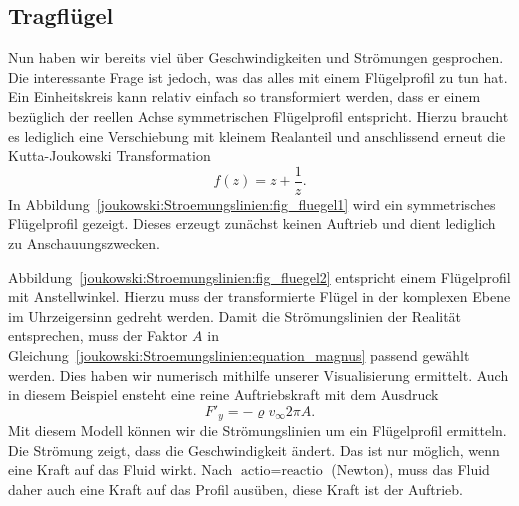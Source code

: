 \subsection{Tragflügel}


Nun haben wir bereits viel über Geschwindigkeiten und Strömungen gesprochen.
Die interessante Frage ist jedoch, was das alles mit einem Flügelprofil zu tun hat.
Ein Einheitskreis kann relativ einfach so transformiert werden, dass er einem bezüglich der reellen Achse symmetrischen Flügelprofil entspricht.
Hierzu braucht es lediglich eine Verschiebung mit kleinem Realanteil und anschlissend erneut die Kutta-Joukowski Transformation 
\[
	f(z)
	=
	z + \frac{1}{z}.
\]
In Abbildung~\ref{joukowski:Stroemungslinien:fig_fluegel1} wird ein symmetrisches Flügelprofil gezeigt. Dieses erzeugt zunächst keinen Auftrieb und dient lediglich zu Anschauungszwecken.

Abbildung~\ref{joukowski:Stroemungslinien:fig_fluegel2} entspricht einem Flügelprofil mit Anstellwinkel.
Hierzu muss der transformierte Flügel in der komplexen Ebene im Uhrzeigersinn gedreht werden.
Damit die Strömungslinien der Realität entsprechen,
muss der Faktor $A$ in Gleichung~\eqref{joukowski:Stroemungslinien:equation_magnus} passend gewählt werden.
Dies haben wir numerisch mithilfe unserer Visualisierung ermittelt.
Auch in diesem Beispiel ensteht eine reine Auftriebskraft mit dem Ausdruck
\[
	F'_y
	=
	-\varrho v_{\infty} 2 \pi A.
\]
Mit diesem Modell können wir die Strömungslinien um ein Flügelprofil ermitteln.
Die Strömung zeigt, dass die Geschwindigkeit ändert.
Das ist nur möglich, wenn eine Kraft auf das Fluid wirkt.
Nach $\text{actio}=\text{reactio}$ (Newton), muss das Fluid daher auch eine Kraft auf das Profil ausüben, diese Kraft ist der Auftrieb.
